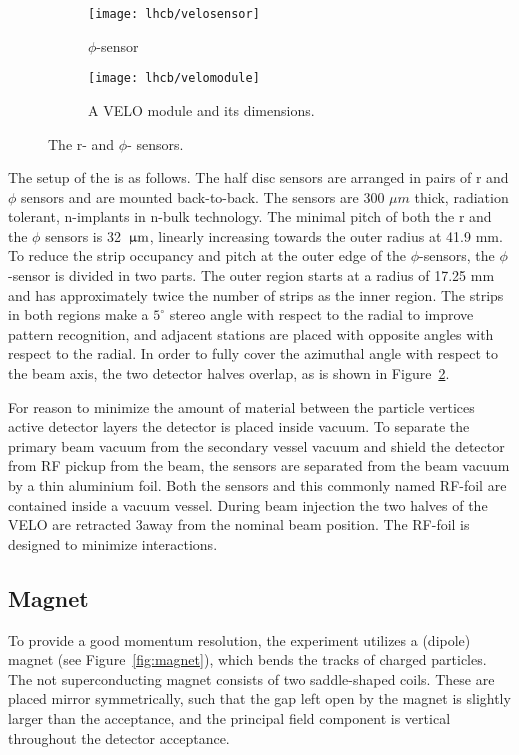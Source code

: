 \begin{figure}
\centering
\begin{subfigure}[b]{0.5\textwidth}
\centering
\texttt{[image: lhcb/velosensor]}
\caption{\velo $\phi$-sensor}
\label{fig:velosensor}
\end{subfigure}
\begin{subfigure}[b]{0.5\textwidth}
\centering
\texttt{[image: lhcb/velomodule]}
\caption{A VELO module and its dimensions.}
\label{fig:velomodule}
\end{subfigure}
\caption{The \velo r- and $\phi$- sensors.}\label{fig:veloschema}
\end{figure}



The setup of the \velo is as follows. The half disc sensors are arranged in
pairs of r and $\phi$ sensors and are mounted back-to-back. The sensors are 300
$\mu m$ thick, radiation tolerant, n-implants in n-bulk technology. The
minimal pitch of both the r and the $\phi$ sensors is 32 ${\,\upmu\rm m}$, linearly
increasing towards the outer radius at 41.9 mm. To reduce the strip occupancy
and pitch at the outer edge of the $\phi$-sensors, the $\phi$-sensor is divided
in two parts. The outer region starts at a radius of 17.25 mm and has
approximately twice the number of strips as the inner region. The strips in
both regions make a $5^\circ$ stereo angle with respect to the radial to
improve pattern recognition, and adjacent stations are placed with opposite
angles with respect to the radial. In order to fully cover the azimuthal angle
with respect to the beam axis, the two detector halves overlap, as is shown in
Figure~\ref{fig:velomodule}.

For reason to minimize the amount of material between the particle vertices
active detector layers the detector is placed inside vacuum. To separate the
primary beam vacuum from the secondary vessel vacuum and shield the detector
from RF pickup from the beam, the sensors are separated from the beam vacuum by
a thin aluminium foil. Both the sensors and this commonly named RF-foil are
contained inside a vacuum vessel. During beam injection the two halves of the
VELO are retracted 3\cm away from the nominal beam position. The RF-foil is
designed to minimize interactions.

\subsection{Magnet}

To provide a good momentum resolution, the \lhcb experiment utilizes a (dipole)
magnet (see Figure~\ref{fig:magnet}), which bends the tracks of charged
particles. The not superconducting magnet consists of two saddle-shaped coils.
These are placed mirror symmetrically, such that the gap left open by the
magnet is slightly larger than the \lhcb acceptance, and the principal field
component is vertical throughout the detector acceptance.

